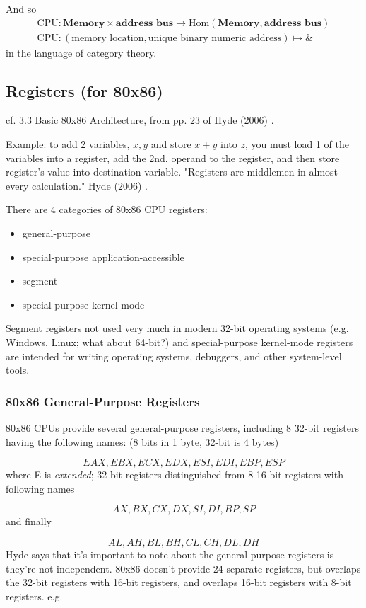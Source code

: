 \documentclass[10pt]{amsart}
\begin{document}
And so
\[
\begin{gathered}
\text{CPU} : \textbf{Memory} \times \textbf{address bus} \to \text{Hom}{(\textbf{Memory} , \textbf{address bus}) } \\ 
\text{CPU}: (\text{memory location} , \text{unique binary numeric address}) \mapsto \&
\end{gathered}
\]
in the language of category theory.  

\subsection{Registers (for 80x86)}  

cf. 3.3 Basic 80x86 Architecture, from pp. 23 of Hyde (2006) \cite{Hyde2006}.  

Example: to add 2 variables, $x,y$ and store $x+y$ into $z$, you must load 1 of the variables into a register, add the 2nd. operand to the register, and then store register's value into destination variable.  "Registers are middlemen in almost every calculation." Hyde (2006) \cite{Hyde2006}.  


There are 4 categories of 80x86 CPU registers: 
\begin{itemize}
	\item general-purpose
	\item special-purpose application-accessible
	\item segment
	\item special-purpose kernel-mode
\end{itemize}
Segment registers not used very much in modern 32-bit operating systems (e.g. Windows, Linux; what about 64-bit?) and special-purpose kernel-mode registers are intended for writing operating systems, debuggers, and other system-level tools.  

\subsubsection{80x86 General-Purpose Registers}  

80x86 CPUs provide several general-purpose registers, including 8 32-bit registers having the following names: (8 bits in 1 byte, 32-bit is 4 bytes)

\[
EAX, EBX, ECX, EDX, ESI, EDI, EBP, ESP
\]
where E is \emph{extended}; 32-bit registers distinguished from 8 16-bit registers with following names 

\[
AX, BX, CX, DX, SI, DI, BP, SP
\]
and finally 

\[
AL, AH, BL, BH, CL, CH, DL, DH
\]
Hyde says that it's important to note about the general-purpose registers is they're not independent.  80x86 doesn't provide 24 separate registers, but overlaps the 32-bit registers with 16-bit registers, and overlaps 16-bit registers with 8-bit registers.  e.g.
\end{document}
